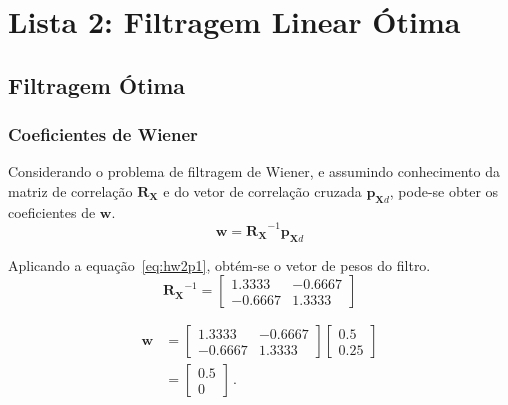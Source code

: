 \section{Lista 2: Filtragem Linear Ótima} %


\subsection{Filtragem Ótima} %


\subsubsection*{Coeficientes de Wiener} %

Considerando o problema de filtragem de Wiener, e assumindo conhecimento da matriz de correlação $\mathbf{R_{X}}$ e do vetor de correlação cruzada $\mathbf{p}_{\mathbf{X} d}$, pode-se obter os coeficientes de $\mathbf{w}$.
\begin{equation} 
    \mathbf{w} = \mathbf{R_{X}}^{-1} \mathbf{p}_{\mathbf{X} d} \label{eq:hw2p1}
\end{equation}

Aplicando a equação~\ref{eq:hw2p1}, obtém-se o vetor de pesos do filtro.
\begin{equation*}
    \mathbf{R_{X}}^{-1} =  \left[ \begin{matrix} 1.3333 & -0.6667 \\ -0.6667 & 1.3333 \end{matrix} \right]
\end{equation*}

\begin{align*} 
    \mathbf{w} &= \left[ \begin{matrix} 1.3333 & -0.6667 \\ -0.6667 & 1.3333 \end{matrix} \right] \left[ \begin{matrix} 0.5 \\ 0.25 \end{matrix} \right] \\
        &= \left[ \begin{matrix} 0.5 \\ 0 \end{matrix} \right] \, .
\end{align*}


